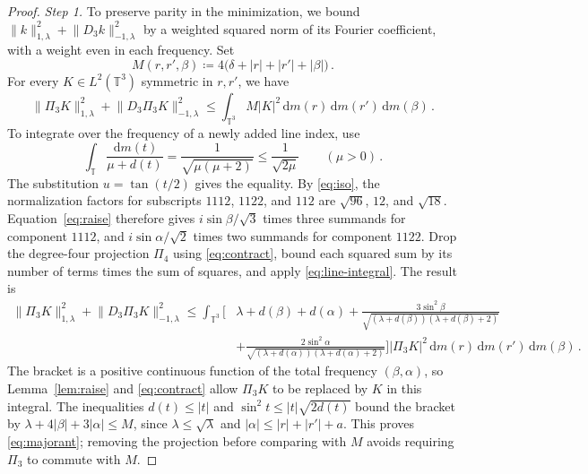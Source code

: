 \documentclass[11pt]{amsart}
\theoremstyle{plain}
\theoremstyle{definition}
\newcommand{\T}{\mathbb T}
\newcommand{\1}{\mathbf 1}
\newcommand{\norm}[1]{\lVert #1\rVert}
\newcommand{\abs}[1]{\lvert #1\rvert}
\newcommand{\dd}{\,\mathrm d}
\newcommand{\Hminus}[1]{\norm{#1}_{-1,\lambda}}
\newcommand{\Hplus}[1]{\norm{#1}_{1,\lambda}}
\begin{document}
	\begin{proof}
		\noindent\emph{Step 1.}
		To preserve parity in the minimization, we bound
		$\Hplus k^2+\Hminus{D_3k}^2$ by a weighted squared norm of its Fourier
		coefficient, with a weight even in each frequency.
		Set
		\begin{equation}\label{eq:M}
			M(r,r',\beta)\coloneqq
			4\bigl(\delta+\abs r+\abs{r'}+\abs\beta\bigr)\, .
		\end{equation}
		For every $K\in L^2(\T^3)$ symmetric in $r,r'$, we have
		\begin{equation}\label{eq:majorant}
			\Hplus{\Pi_3K}^2+\Hminus{D_3\Pi_3K}^2
			\leq\int_{\T^3}M\abs K^2
			\dd m(r)\dd m(r')\dd m(\beta)\, .
		\end{equation}
		To integrate over the frequency of a newly added line index, use
		\begin{equation}\label{eq:line-integral}
			\int_\T\frac{\dd m(t)}{\mu+d(t)}
			=\frac1{\sqrt{\mu(\mu+2)}}\leq\frac1{\sqrt{2\mu}}
			\qquad(\mu>0)\, .
		\end{equation}
		The substitution $u=\tan(t/2)$ gives the equality.
		By \eqref{eq:iso}, the normalization factors for subscripts $1112$, $1122$,
		and $112$ are $\sqrt{96}$, $12$, and $\sqrt{18}$.
		Equation~\eqref{eq:raise} therefore gives $i\sin\beta/\sqrt3$ times
		three summands for component $1112$, and $i\sin\alpha/\sqrt2$ times
		two summands for component $1122$.
		Drop the degree-four projection $\Pi_4$ using \eqref{eq:contract}, bound each squared
		sum by its number of terms times the sum of squares, and apply
		\eqref{eq:line-integral}.  The result is
		\begin{align*}
			\Hplus{\Pi_3K}^2+\Hminus{D_3\Pi_3K}^2
			\leq\int_{\T^3}\Biggl[&\lambda+d(\beta)+d(\alpha)
			+\frac{3\sin^2\beta}
			{\sqrt{(\lambda+d(\beta))(\lambda+d(\beta)+2)}}\\
			&+\frac{2\sin^2\alpha}
			{\sqrt{(\lambda+d(\alpha))(\lambda+d(\alpha)+2)}}\Biggr]
			\abs{\Pi_3K}^2\dd m(r)\dd m(r')\dd m(\beta)\, .
		\end{align*}
		The bracket is a positive continuous function of the total frequency
		$(\beta,\alpha)$, so Lemma~\ref{lem:raise} and \eqref{eq:contract}
		allow $\Pi_3K$ to be replaced by $K$ in this integral.
		The inequalities $d(t)\leq\abs t$ and
		$\sin^2t\leq\abs t\sqrt{2d(t)}$ bound the bracket by
		$\lambda+4\abs\beta+3\abs\alpha\leq M$, since
		$\lambda\leq\sqrt\lambda$ and $\abs\alpha\leq\abs r+\abs{r'}+a$.
		This proves \eqref{eq:majorant}; removing the projection before comparing
		with $M$ avoids requiring $\Pi_3$ to commute with $M$.
		

\end{proof}
\end{document}
